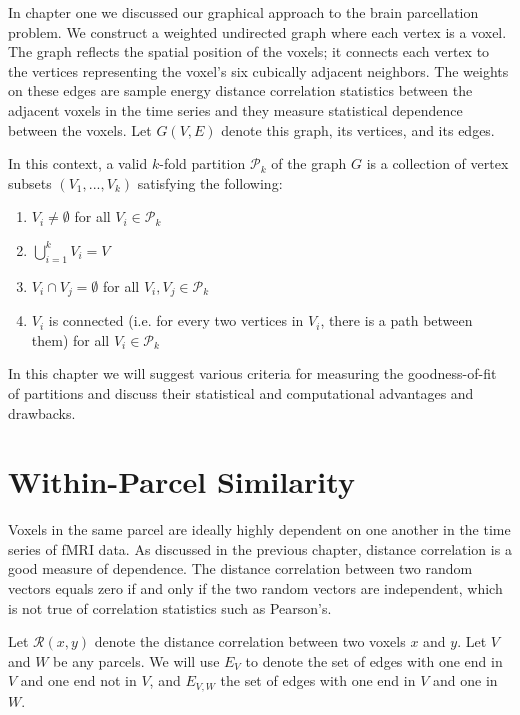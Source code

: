 
In chapter one we discussed our graphical approach to the brain
parcellation problem. We construct a weighted undirected graph where
each vertex is a voxel. The graph reflects the spatial position of the
voxels; it connects each vertex to the vertices representing the voxel's
six cubically adjacent neighbors. The weights on these edges are sample
energy distance correlation statistics between the adjacent voxels in
the time series and they measure statistical dependence between the
voxels. Let $G(V, E)$ denote this graph, its vertices, and its edges.

In this context, a valid $k$-fold partition $\mathcal{P}_k$ of the
graph $G$ is a collection of vertex subsets $(V_1, ..., V_k)$
satisfying the following:

\begin{enumerate}[1.]
\item
$V_i \neq \emptyset$ for all $V_i \in \mathcal{P}_k$

\item
$\bigcup\limits_{i=1}^k V_i = V$

\item
$V_i \cap V_j = \emptyset$ for all $V_i, V_j \in \mathcal{P}_k$

\item
$V_i$ is connected (i.e. for every two vertices in $V_i$, there is a
path between them) for all $V_i \in \mathcal{P}_k$
\end{enumerate}

In this chapter we will suggest various criteria for measuring the
goodness-of-fit of partitions and discuss their statistical and
computational advantages and drawbacks.


\section{Within-Parcel Similarity}

Voxels in the same parcel are ideally highly dependent on one another in
the time series of fMRI data. As discussed in the previous chapter,
distance correlation is a good measure of dependence. The distance
correlation between two random vectors equals zero if and only if the
two random vectors are independent, which is not true of correlation
statistics such as Pearson's.

Let $\mathcal{R}(x,y)$ denote the distance correlation between two
voxels $x$ and $y$.
Let $V$ and $W$ be any parcels. We will use $E_V$ to denote the set of edges with one end in $V$ and one end not in $V$, and $E_{V,W}$ the set
of edges with one end in $V$ and one in $W$.


